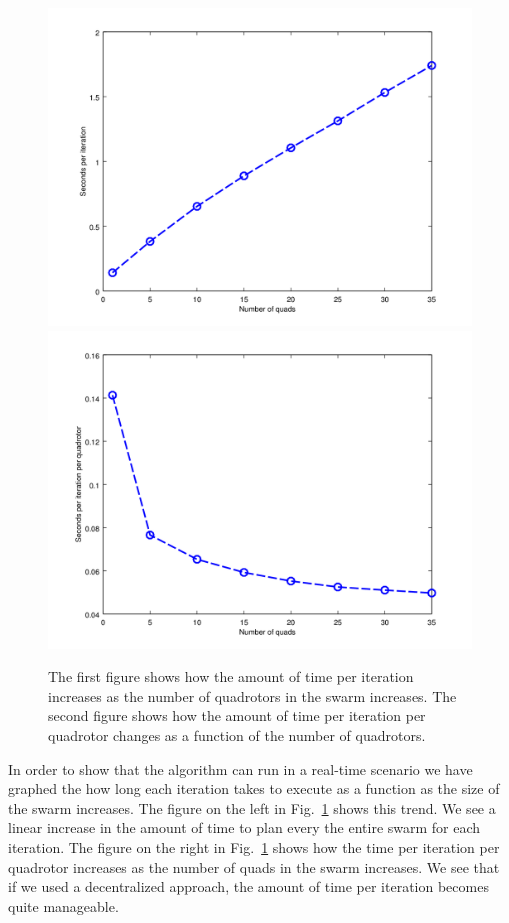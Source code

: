 \documentclass{article}
\begin{document}
\begin{figure}[h!]

    \centering
    \includegraphics[width=0.49\columnwidth]{tasefigs/comp_eff.png}
    \includegraphics[width=0.49\columnwidth]{tasefigs/comp_eff_per_quad.png}

    \caption{The first figure shows how the amount of time per iteration
    increases as the number of quadrotors in the swarm increases. The
    second figure shows how the amount of time per iteration per quadrotor
    changes as a function of the number of quadrotors.}

    \label{fig:comp_eff}

\end{figure}

In order to show that the algorithm can run in a real-time scenario we have
graphed the how long each iteration takes to execute as a function as the size
of the swarm increases. The figure on the left in Fig.~\ref{fig:comp_eff} shows
this trend.  We see a linear increase in the amount of time to plan every the
entire swarm for each iteration. The figure on the right in
Fig.~\ref{fig:comp_eff} shows how the time per iteration per quadrotor
increases as the number of quads in the swarm increases. We see that if we used
a decentralized approach, the amount of time per iteration becomes quite
manageable.

 
\end{document}
